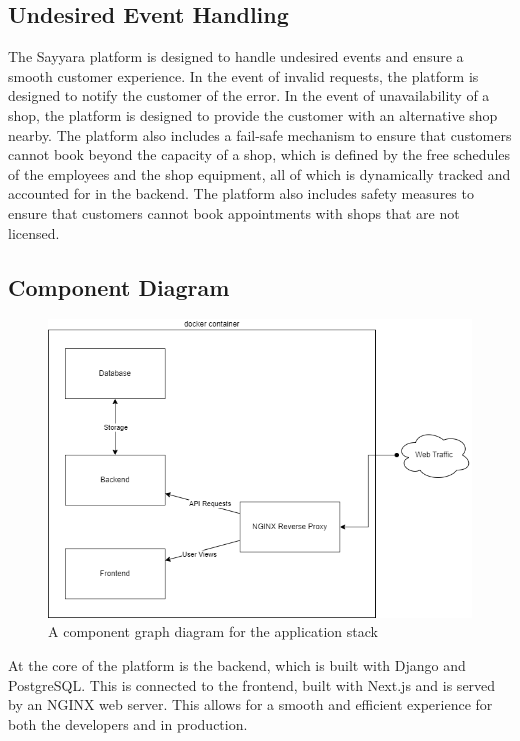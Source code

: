 \documentclass[12pt, titlepage]{article}
\begin{document}
\subsection{Undesired Event Handling}

The Sayyara platform is designed to handle undesired events and ensure a smooth customer experience. In the event of invalid requests, the platform is designed to notify the customer of the error. In the event of unavailability of a shop, the platform is designed to provide the customer with an alternative shop nearby. The platform also includes a fail-safe mechanism to ensure that customers cannot book beyond the capacity of a shop, which is defined by the free schedules of the employees and the shop equipment, all of which is dynamically tracked and accounted for in the backend. The platform also includes safety measures to ensure that customers cannot book appointments with shops that are not licensed.

\subsection{Component Diagram}

\begin{figure}[H]
    \centering
    \includegraphics[scale=0.7]{Design/SystDesign/stack-graph.png}
    \caption{A component graph diagram for the application stack}
    \label{fig:my_label}
\end{figure}

At the core of the platform is the backend, which is built with Django and PostgreSQL. This is connected to the frontend, built with Next.js and is served by an NGINX web server. This allows for a smooth and efficient experience for both the developers and in production.
\end{document}
